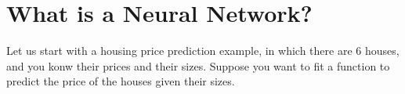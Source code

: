 \section{What is a Neural Network?}

Let us start with a housing price prediction example, in which there are $6$ houses, and you konw their prices and their sizes. Suppose you want to fit a function to predict the price of the houses given their sizes.

\begin{float}
\end{float}
